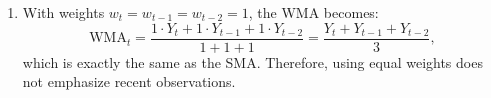 \documentclass[addpoints,12pt,answers]{exam}
\begin{document}
\begin{questions}
\begin{enumerate}[label=(\alph*)]
			\item 
			With weights \(w_t = w_{t-1} = w_{t-2} = 1\), the WMA becomes:
			\[
			\text{WMA}_t = \frac{1\cdot Y_t + 1\cdot Y_{t-1} + 1\cdot Y_{t-2}}{1+1+1} = \frac{Y_t + Y_{t-1} + Y_{t-2}}{3},
			\]
			which is exactly the same as the SMA. Therefore, using equal weights does not emphasize recent observations.
			
		\end{enumerate}
		
		\clearpage
		
		
		
%		

		
		
		
%		
%		
%		
		
	\end{questions}
	
	
\end{document}
